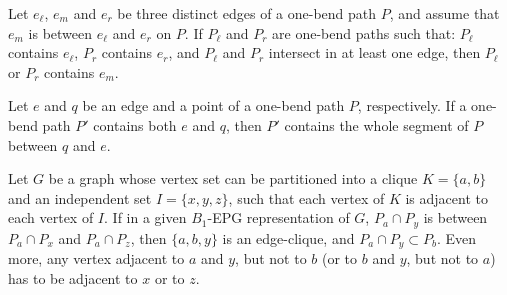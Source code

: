 \begin{fac} \label{f:between}Let $e_{\ell}$, $e_m$ and $e_r$  be three distinct edges of a  one-bend path $P$, and assume that $e_m$ is between $e_{\ell}$ and $e_r$ on $P$. If $P_{\ell}$ and $P_r$ are one-bend paths such that: $P_{\ell}$ contains $e_{\ell}$, $P_r$ contains $e_r$, and  $P_{\ell}$ and $P_r$ intersect in at least one edge, then $P_{\ell}$ or $P_r$ contains $e_m$.
\end{fac}
\begin{fac} \label{f:two points} Let  $e$ and $q$  be an edge and a  point  of a  one-bend path $P$, respectively. If a one-bend path $P'$ contains both $e$ and $q$, then $P'$ contains the whole segment of $P$ between $q$ and $e$.
\end{fac}

\begin{lema}\label{l:abclique}
Let $G$ be a graph whose vertex set  can be partitioned into a clique $K=\{a,b\}$ and an independent set $I=\{x,y,z\}$, such that each vertex of $K$ is adjacent to each vertex of $I$.
If in a given $B_1$-EPG representation of $G$, $P_a\cap P_y$ is between $P_a\cap P_x$ and $P_a\cap P_z$, then $\{a,b,y\}$ is an edge-clique, and
$P_a\cap P_y \subset P_b$. Even more, any vertex adjacent to $a$ and $y$, but not to $b$ (or to $b$ and $y$, but not to $a$) has to be adjacent to $x$ or to $z$.
\end{lema}


 
